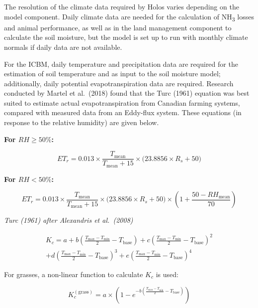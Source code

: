 The resolution of the climate data required by Holos varies depending on the
model component. Daily climate data are needed for the calculation of
NH\textsubscript{3} losses and animal performance, as well as in the land
management component to calculate the soil moisture, but the model is set up to
run with monthly climate normals if daily data are not available.

For the ICBM, daily temperature and precipitation data are required for the
estimation of soil temperature and as input to the soil moisture model;
additionally, daily potential evapotranspiration data are required. Research
conducted by Martel et al.\ (2018) found that the Turc (1961) equation was best
suited to estimate actual evapotranspiration from Canadian farming systems,
compared with measured data from an Eddy-flux system. These equations (in
response to the relative humidity) are given below.

\bigskip
\noindent\textbf{For $RH \geq 50\%$:}

\begin{equation}
    ET_r = 0.013 \times \frac{T_{\mathrm{mean}}}{T_{\mathrm{mean}} + 15}
           \times \bigl(23.8856 \times R_s + 50\bigr)
    \tag{Eq.\ 1.6.2.1}
\end{equation}

\noindent\textbf{For $RH < 50\%$:}

\begin{equation}
    ET_r = 0.013 \times \frac{T_{\mathrm{mean}}}{T_{\mathrm{mean}} + 15}
           \times \bigl(23.8856 \times R_s + 50\bigr)
           \times \left(1 + \frac{50 - RH_{\mathrm{mean}}}{70}\right)
    \tag{Eq.\ 1.6.2.2}
\end{equation}

\noindent\textit{Turc (1961) after Alexandris et al.\ (2008)}

\begin{multline}
    K_c = a + b\!\left(\frac{T_{\max}-T_{\min}}{2} - T_{\mathrm{base}}\right)
            + c\!\left(\frac{T_{\max}-T_{\min}}{2} - T_{\mathrm{base}}\right)^{\!2} \\
            + d\!\left(\frac{T_{\max}-T_{\min}}{2} - T_{\mathrm{base}}\right)^{\!3}
            + e\!\left(\frac{T_{\max}-T_{\min}}{2} - T_{\mathrm{base}}\right)^{\!4}
    \tag{Eq.\ 1.6.2.3}
\end{multline}

\noindent For grasses, a non-linear function to calculate $K_c$ is used:

\begin{equation}
    K_c^{(\mathrm{grass})} = a \times
        \left(1 - e^{-b\left(\tfrac{T_{\max}-T_{\min}}{2} - T_{\mathrm{base}}\right)}\right)
    \tag{Eq.\ 1.6.2.4}
\end{equation}

